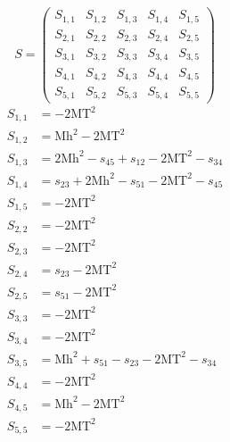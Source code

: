 \documentclass[a4paper]{article}
\begin{document}
\begin{equation}
S=\left(\begin{array}{ccccc}
   S_{1,1}&
   S_{1,2}&
   S_{1,3}&
   S_{1,4}&
   S_{1,5}\\
   S_{2,1}&
   S_{2,2}&
   S_{2,3}&
   S_{2,4}&
   S_{2,5}\\
   S_{3,1}&
   S_{3,2}&
   S_{3,3}&
   S_{3,4}&
   S_{3,5}\\
   S_{4,1}&
   S_{4,2}&
   S_{4,3}&
   S_{4,4}&
   S_{4,5}\\
   S_{5,1}&
   S_{5,2}&
   S_{5,3}&
   S_{5,4}&
   S_{5,5}\end{array}\right)
\end{equation}
\begin{subequations}
\begin{align}
   S_{1,1}&=-2\text{MT}^2\\
   S_{1,2}&=\text{Mh}^2-2\text{MT}^2\\
   S_{1,3}&=2\text{Mh}^2-s_{45}+s_{12}-2\text{MT}^2-s_{34}\\
   S_{1,4}&=s_{23}+2\text{Mh}^2-s_{51}-2\text{MT}^2-s_{45}\\
   S_{1,5}&=-2\text{MT}^2\\
   S_{2,2}&=-2\text{MT}^2\\
   S_{2,3}&=-2\text{MT}^2\\
   S_{2,4}&=s_{23}-2\text{MT}^2\\
   S_{2,5}&=s_{51}-2\text{MT}^2\\
   S_{3,3}&=-2\text{MT}^2\\
   S_{3,4}&=-2\text{MT}^2\\
   S_{3,5}&=\text{Mh}^2+s_{51}-s_{23}-2\text{MT}^2-s_{34}\\
   S_{4,4}&=-2\text{MT}^2\\
   S_{4,5}&=\text{Mh}^2-2\text{MT}^2\\
   S_{5,5}&=-2\text{MT}^2
\end{align}
\end{subequations}
\end{document}
